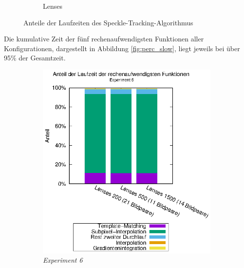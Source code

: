 \begin{center}
\begin{figure}[h!]
\begin{subfigure}[b]{0.5\textwidth}
			\caption{Lenses}
			\label{fig:perc_speckle_lenses}
		\end{subfigure}
		\caption{Anteile der Laufzeiten des Speckle-Tracking-Algorithmus}
		\label{fig:perc_speckle}
	\end{figure}
\end{center}

Die kumulative Zeit der fünf rechenaufwendigsten Funktionen aller Konfigurationen, dargestellt in Abbildung \ref{fig:perc_slow}, liegt jeweils bei über 95\% der Gesamtzeit. 

\begin{center}
	\begin{figure}[h!]
		\begin{subfigure}[b]{0.5\textwidth}
			\centering
			\includegraphics[width=\textwidth]{pdf/slow_exp6}
			\caption{\textit{Experiment 6}}
			\label{fig:perc_slow_exp6}
		\end{subfigure}
		\begin{subfigure}[b]{0.5\textwidth}
			\centering

\end{subfigure}
\end{figure}
\end{center}
